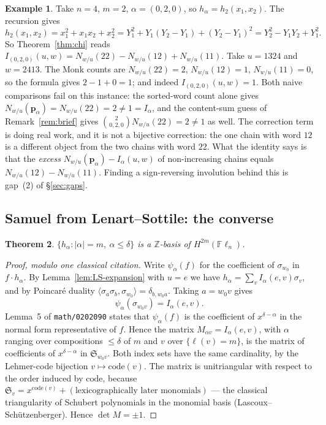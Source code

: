 \documentclass[11pt]{article}
\theoremstyle{plain}
\newtheorem{theorem}{Theorem}[section]
\theoremstyle{definition}
\newtheorem{example}[theorem]{Example}
\DeclareMathOperator{\len}{\ell}
\newcommand{\Sch}{\mathfrak{S}}
\newcommand{\Fl}{\mathbb{F}\ell}
\newcommand{\pv}{\mathbf{p}}
\newcommand{\code}{\mathrm{code}}
\begin{document}
\begin{example}\label{ex:main}
Take $n=4$, $m=2$, $\alpha=(0,2,0)$, so $h_\alpha=h_2(x_1,x_2)$. The recursion
gives
\[
  h_2(x_1,x_2)=x_1^2+x_1x_2+x_2^2
             =Y_1^2+Y_1(Y_2-Y_1)+(Y_2-Y_1)^2
             =Y_2^2-Y_1Y_2+Y_1^2 .
\]
So Theorem~\ref{thm:chi} reads
$I_{(0,2,0)}(u,w)=N_{w/u}(22)-N_{w/u}(12)+N_{w/u}(11)$.
Take $u=1324$ and $w=2413$. The Monk counts are
$N_{w/u}(22)=2$, $N_{w/u}(12)=1$, $N_{w/u}(11)=0$, so the formula gives
$2-1+0=1$; and indeed $I_{(0,2,0)}(u,w)=1$. Both naive comparisons fail on this
instance: the sorted-word count alone gives
$N_{w/u}(\pv_\alpha)=N_{w/u}(22)=2\neq1=I_\alpha$, and the content-sum guess
of Remark~\ref{rem:brief} gives $\binom{2}{0,2,0}N_{w/u}(22)=2\neq1$ as well.
The correction term is doing real work, and it is not a bijective
correction: the one chain with word $12$ is a different object from the two
chains with word $22$. What the identity says is that the \emph{excess}
$N_{w/u}(\pv_\alpha)-I_\alpha(u,w)$ of non-increasing chains equals
$N_{w/u}(12)-N_{w/u}(11)$. Finding a sign-reversing involution behind this is
gap~(2) of \S\ref{sec:gaps}.
\end{example}

\subsection{Samuel from Lenart--Sottile: the converse}

\begin{theorem}\label{thm:basis}
$\{h_\alpha : |\alpha|=m,\ \alpha\le\delta\}$ is a $\mathbb{Z}$-basis of
$H^{2m}(\Fl_n)$.
\end{theorem}

\begin{proof}[Proof, modulo one classical citation]
Write $\psi_\alpha(f)$ for the coefficient of $\sigma_{w_0}$ in $f\cdot
h_\alpha$. By Lemma~\ref{lem:LS-expansion} with $u=e$ we have
$h_\alpha=\sum_{v}I_\alpha(e,v)\sigma_v$, and by Poincar\'e duality
$\langle\sigma_a\sigma_b,\sigma_{w_0}\rangle=\delta_{b,w_0a}$. Taking
$a=w_0v$ gives
\[
  \psi_\alpha(\sigma_{w_0v})=I_\alpha(e,v).
\]
Lemma~5 of \texttt{math/0202090} states that $\psi_\alpha(f)$ is the
coefficient of $x^{\delta-\alpha}$ in the normal form representative of $f$.
Hence the matrix $M_{\alpha v}=I_\alpha(e,v)$, with $\alpha$ ranging over
compositions $\le\delta$ of $m$ and $v$ over $\{\len(v)=m\}$, is the matrix of
coefficients of $x^{\delta-\alpha}$ in $\Sch_{w_0v}$. Both index sets have the
same cardinality, by the Lehmer-code bijection $v\mapsto\code(v)$. The matrix is
unitriangular with respect to the order induced by $\code$, because
$\Sch_v=x^{\code(v)}+(\text{lexicographically later monomials})$ --- the
classical triangularity of Schubert polynomials in the monomial basis
(Lascoux--Sch\"utzenberger). Hence $\det M=\pm1$.
\end{proof}
\end{document}
